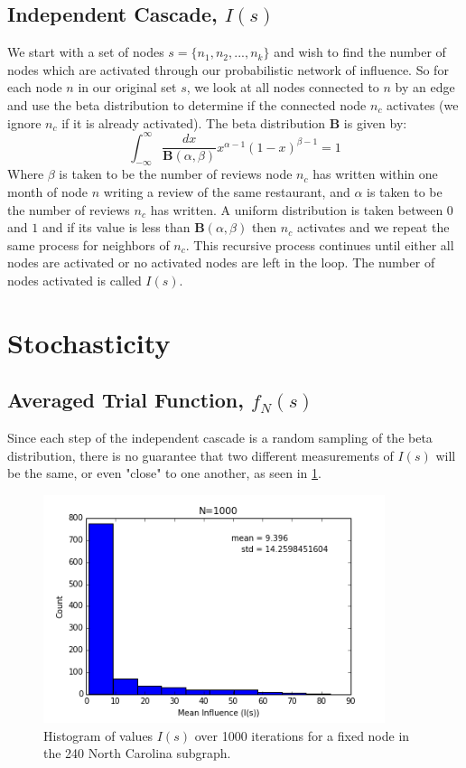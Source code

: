 \documentclass{article}
\begin{document}
	\subsection{Independent Cascade, $I(s)$}
	
	We start with a set of nodes $s = \{n_1,n_2,...,n_k\}$ and wish to find the number of nodes which are activated through our probabilistic network of influence. So for each node $n$ in our original set $s$, we look at all nodes connected to $n$ by an edge and use the beta distribution to determine if the connected node $n_c$ activates (we ignore $n_c$ if it is already activated). The beta distribution $\boldsymbol{B}$ is given by:
	\begin{equation}
	\boxed{
			\int_{-\infty}^{\infty} \frac{dx}{\boldsymbol{B}(\alpha,\beta)}x^{\alpha-1}(1-x)^{\beta - 1} = 1
		}
	\end{equation}
	Where $\beta$ is taken to be the number of reviews node $n_c$ has written within one month of node $n$ writing a review of the same restaurant, and $\alpha$ is taken to be the number of reviews $n_c$ has written. A uniform distribution is taken between $0$ and $1$ and if its value is less than $\boldsymbol{B}(\alpha,\beta)$ then $n_c$ activates and we repeat the same process for neighbors of $n_c$. This recursive process continues until either all nodes are activated or no activated nodes are left in the loop. The number of nodes activated is called $I(s)$.
	
	
	\section{Stochasticity}
	
	\subsection{Averaged Trial Function, $f_N(s)$}
	
	Since each step of the independent cascade is a random sampling of the beta distribution, there is no guarantee that two different measurements of $I(s)$ will be the same, or even "close" to one another, as seen in \ref{fig:Inf_1000}. 
	
	\begin{figure}[h!]
		\centering
		\includegraphics[width=100mm]{N1000_influence.png}
		\caption{Histogram of values $I(s)$ over 1000 iterations for a fixed node in the 240 North Carolina subgraph.}
		\label{fig:Inf_1000}
	\end{figure}
	
\end{document}
